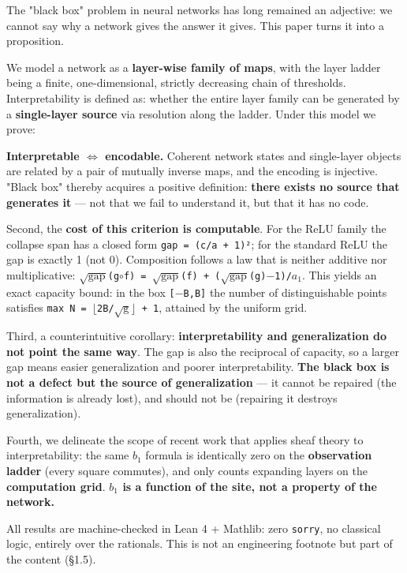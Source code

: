\documentclass[11pt,a4paper]{ctexart}
\begin{document}
The "black box" problem in neural networks has long remained an adjective: we cannot say why a network gives the answer it gives. This paper turns it into a proposition.

We model a network as a \textbf{layer-wise family of maps}, with the layer ladder being a finite, one-dimensional, strictly decreasing chain of thresholds. Interpretability is defined as: whether the entire layer family can be generated by a \textbf{single-layer source} via resolution along the ladder. Under this model we prove:

\textbf{Interpretable \ensuremath{\Longleftrightarrow} encodable.} Coherent network states and single-layer objects are related by a pair of mutually inverse maps, and the encoding is injective. "Black box" thereby acquires a positive definition: \textbf{there exists no source that generates it} — not that we fail to understand it, but that it has no code.

Second, the \textbf{cost of this criterion is computable}. For the ReLU family the collapse span has a closed form \texttt{gap = (c/a + 1)²}; for the standard ReLU the gap is exactly 1 (not 0). Composition follows a law that is neither additive nor multiplicative: \texttt{\ensuremath{\sqrt{\mathrm{gap}}}(g\ensuremath{\circ}f) = \ensuremath{\sqrt{\mathrm{gap}}}(f) + (\ensuremath{\sqrt{\mathrm{gap}}}(g)\ensuremath{-}1)/\ensuremath{a_{1}}}. This yields an exact capacity bound: in the box \texttt{[\ensuremath{-}B,B]} the number of distinguishable points satisfies \texttt{max N = \ensuremath{\lfloor}2B/\ensuremath{\sqrt{\mathrm{g}}}\ensuremath{\rfloor} + 1}, attained by the uniform grid.

Third, a counterintuitive corollary: \textbf{interpretability and generalization do not point the same way}. The gap is also the reciprocal of capacity, so a larger gap means easier generalization and poorer interpretability. \textbf{The black box is not a defect but the source of generalization} — it cannot be repaired (the information is already lost), and should not be (repairing it destroys generalization).

Fourth, we delineate the scope of recent work that applies sheaf theory to interpretability: the same \texttt{\ensuremath{b_{1}}} formula is identically zero on the \textbf{observation ladder} (every square commutes), and only counts expanding layers on the \textbf{computation grid}. \textbf{\texttt{\ensuremath{b_{1}}} is a function of the site, not a property of the network.}

All results are machine-checked in Lean 4 + Mathlib: zero \texttt{sorry}, no classical logic, entirely over the rationals. This is not an engineering footnote but part of the content (§1.5).
\end{document}
